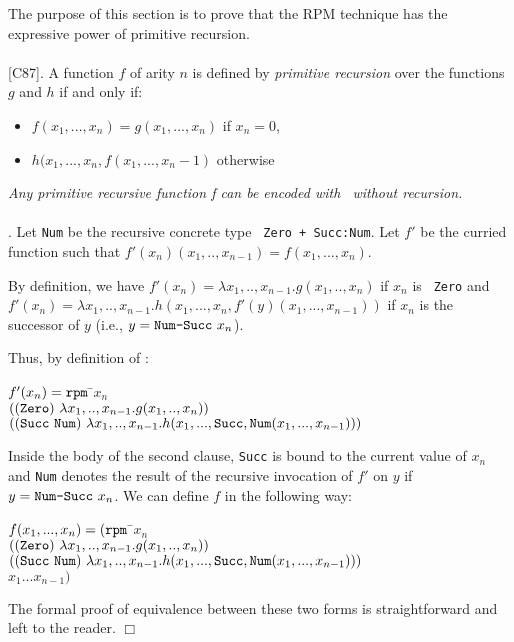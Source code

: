 \begin{sloppypar}
The purpose of this section is to prove that the RPM technique 
has the expressive power of primitive recursion.
~~~\\
~~~\\
 [C87]. A function $f$ of arity $n$ is
defined by {\em primitive recursion} over the functions $g$ and $h$ if
and only if: 
\begin{itemize}
\item $f(x_1,...,x_ n) = g(x_1,...,x_n)$ if $x_n = 0$,
\item $h(x_1,...,x_n,f(x_1,...,x_n-1)$ otherwise
\end{itemize}

 {\em Any primitive recursive function f can be
encoded with \rpm\ without recursion.}
~~\\
~~\\
. Let {\tt Num} be the recursive concrete type {\tt
Zero + Succ:Num}. Let $f'$ be the
curried function such that $f'(x_n)(x_1,..,x_{n-1}) = f(x_1,...,x_n)$.

By definition, we have
$f'(x_n) = \lambda x_1,..,x_{n-1} . g(x_1,..,x_n)$ if $x_n$ is {\tt
Zero} and $f'(x_n) = \lambda x_1,..,x_{n-1} .
h(x_1,...,x_n,f'(y)(x_1,...,x_{n-1}))$ if $x_n$ is the successor of
$y$ (i.e., $y = \mbox{\tt Num-Succ}~ x_n$).

Thus, by definition of \rpm:
\begin{tabbing}
$f'(x_n) = {\tt rpm}~$\=$x_n$ \\
        \>$(({\tt Zero})~ \lambda x_1,..,x_{n-1} .
                                g(x_1,..,x_n))$ \\
        \>$(({\tt Succ~Num})~ \lambda x_1,..,x_{n-1} .
                        h(x_1,...,{\tt Succ},{\tt Num}(x_1,...,x_{n-1})))$
\end{tabbing}
Inside the body of the second clause, {\tt Succ} is bound to the
current value of $x_n$ and {\tt Num} denotes the result of the
recursive invocation of $f'$ on $y$ if $y = \mbox{\tt Num-Succ}~x_n$.
We can define $f$ in the following way:
\begin{tabbing}
$f(x_1,...,x_n) = ({\tt rpm}~$\=$x_n$ \\
                \>$(({\tt Zero})~ \lambda x_1,..,x_{n-1} .
                                g(x_1,..,x_n))$ \\
                \>$(({\tt Succ~ Num})~ \lambda x_1,..,x_{n-1} .
                                h(x_1,...,{\tt Succ},{\tt
                                        Num}(x_1,...,x_{n-1})))$ \\
                \> $x_1 ... x_{n-1})$
\end{tabbing}
The formal proof of equivalence between these two forms is
straightforward and left to the reader. \hfill$\Box$


\end{sloppypar}
